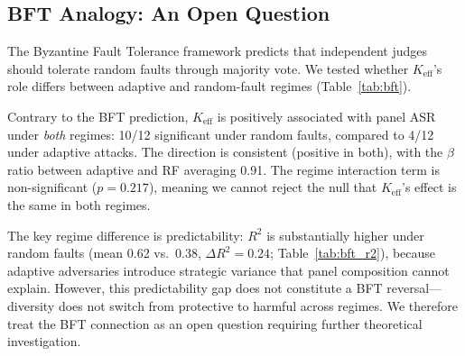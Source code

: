 \documentclass[11pt,a4paper]{article}
\begin{document}
\subsection{BFT Analogy: An Open Question}
\label{sec:bft}

The Byzantine Fault Tolerance framework predicts that independent judges should tolerate random faults through majority vote.
We tested whether $K_{\mathrm{eff}}$'s role differs between adaptive and random-fault regimes (Table~\ref{tab:bft}).

Contrary to the BFT prediction, $K_{\mathrm{eff}}$ is positively associated with panel ASR under \emph{both} regimes: 10/12 significant under random faults, compared to 4/12 under adaptive attacks.
The direction is consistent (positive in both), with the $\beta$ ratio between adaptive and RF averaging 0.91.
The regime interaction term is non-significant ($p = 0.217$), meaning we cannot reject the null that $K_{\mathrm{eff}}$'s effect is the same in both regimes.

The key regime difference is predictability: $R^2$ is substantially higher under random faults (mean 0.62 vs.\ 0.38, $\Delta R^2 = 0.24$; Table~\ref{tab:bft_r2}), because adaptive adversaries introduce strategic variance that panel composition cannot explain.
However, this predictability gap does not constitute a BFT reversal---diversity does not switch from protective to harmful across regimes.
We therefore treat the BFT connection as an open question requiring further theoretical investigation.
\end{document}

